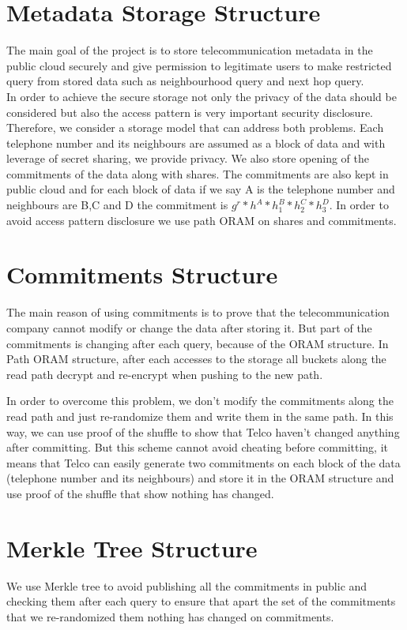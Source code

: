 \documentclass[12pt]{article}
\begin{document}
   \section{Metadata Storage Structure}
The main goal of the project is to store telecommunication metadata in the public cloud securely and give permission to legitimate users to make restricted query from stored data such as neighbourhood query and next hop query.\\
In order to achieve the secure storage not only the privacy of the data should be considered but also the access pattern is very important security disclosure. Therefore, we consider a storage model that can address both problems. Each telephone number and its neighbours are assumed as a block of data and with leverage of secret sharing, we provide privacy. We also store opening of the commitments of the data along with shares. The commitments are also kept in public cloud and for each block of data if we say A is the telephone number and neighbours are B,C and D the commitment is $g^r* h^A*h_1^B*h_2^C*h_3^D$. In order to avoid access pattern disclosure we use path ORAM on shares and commitments.


      \section{Commitments Structure}
The main reason of using commitments is to prove that the telecommunication company cannot modify or change the data after storing it. But part of the commitments is changing after each query, because of the ORAM structure. In Path ORAM structure, after each accesses to the storage all buckets along the read path decrypt and re-encrypt when pushing to the new path. 

 In order to overcome this problem, we don’t modify the commitments along the read path and just re-randomize them and write them in the same path. In this way, we can use proof of the shuffle to show that Telco haven’t changed anything after committing. But this scheme cannot avoid cheating before committing, it means that Telco can easily generate two commitments on each block of the data (telephone number and its neighbours) and store it in the ORAM structure and use proof of the shuffle that show nothing has changed.




\section{Merkle Tree Structure}
We use Merkle tree to avoid publishing all the commitments in public and checking them after each query to ensure that apart the set of the commitments that we re-randomized them nothing has changed on commitments.
\end{document}
